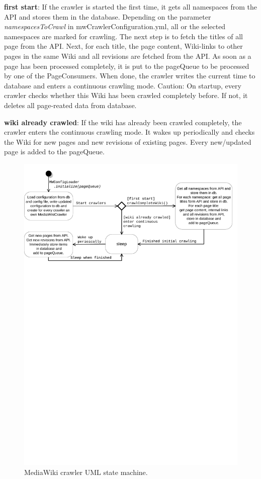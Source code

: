 \documentclass[a4paper,twoside]{book}      %
\begin{document}
\textbf{first start}: If the crawler is started the first time, it gets all namespaces from the API and stores them in the database. Depending on the parameter \emph{namespacesToCrawl} in mwCrawlerConfiguration.yml, all or the selected namespaces are marked for crawling. The next step is to fetch the titles of all page from the API. Next, for each title, the page content, Wiki-links to other pages in the same Wiki and all revisions are fetched from the API. As soon as a page has been processed completely, it is put to the pageQueue to be processed by one of the PageConsumers. When done, the crawler writes the current time to database and enters a continuous crawling mode. Caution: On startup, every crawler checks whether this Wiki has been crawled completely before. If not, it deletes all page-reated data from database. 

\textbf{wiki already crawled}: If the wiki has already been crawled completely, the crawler enters the continuous crawling mode. It wakes up periodically and checks the Wiki for new pages and new revisions of existing pages. Every new/updated page is added to the pageQueue.

\begin{figure}[htb]
\centering
\includegraphics[width=\textwidth]{img/MediaWikiCrawler-UMLStateMachine.pdf}
\caption{MediaWiki crawler UML state machine.}
\label{fig:MWCrawler-state_machine}
\end{figure}
\end{document}
